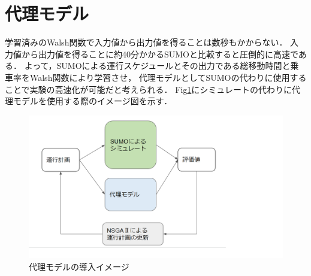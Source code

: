 \documentclass[main]{subfiles}
\begin{document}
    \section{代理モデル}
    学習済みのWalsh関数で入力値から出力値を得ることは数秒もかからない．
    入力値から出力値を得ることに約40分かかるSUMOと比較すると圧倒的に高速である．
    よって，SUMOによる運行スケジュールとその出力である総移動時間と乗車率をWalsh関数により学習させ，
    代理モデルとしてSUMOの代わりに使用することで実験の高速化が可能だと考えられる．
    Fig\ref{dairi}にシミュレートの代わりに代理モデルを使用する際のイメージ図を示す．
    \begin{figure}
        \centering
        \includegraphics[width=\linewidth]{figures/dairi.png}
        \caption{代理モデルの導入イメージ}
        \label{dairi}
    \end{figure}
\end{document}
